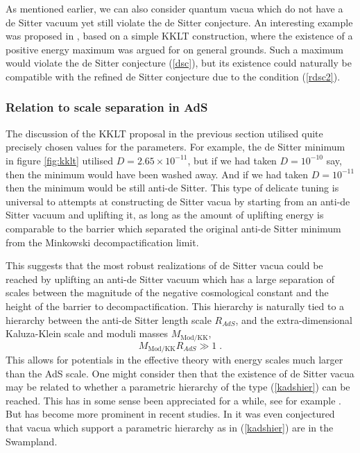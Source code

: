 \documentclass[11pt,a4paper]{article}
\numberwithin{equation}{section}
\numberwithin{table}{section}\setlength{\multlinegap}{25pt}
\newcommand{\be}{\begin{equation}}
\newcommand{\ee}{\end{equation}}
\begin{document}
{As mentioned earlier, we can also consider quantum vacua which do not have a de Sitter vacuum yet still violate the de Sitter conjecture. An interesting example was proposed in \cite{Conlon:2018eyr}, based on a simple KKLT construction, where the existence of a positive energy maximum was argued for on general grounds. Such a maximum would violate the de Sitter conjecture (\ref{dsc}), but its existence could naturally be compatible with the refined de Sitter conjecture due to the condition (\ref{rdsc2}). 

\subsubsection{Relation to scale separation in AdS}
\label{sec:scsepcon}

The discussion of the KKLT proposal in the previous section utilised quite precisely chosen values for the parameters. For example, the de Sitter minimum in figure \ref{fig:kklt} utilised $D=2.65 \times 10^{-11}$, but if we had taken $D= 10^{-10}$ say, then the minimum would have been washed away. And if we had taken $D=10^{-11}$ then the minimum would be still anti-de Sitter. This type of delicate tuning is universal to attempts at constructing de Sitter vacua by starting from an anti-de Sitter vacuum and uplifting it, as long as the amount of uplifting energy is comparable to the barrier which separated the original anti-de Sitter minimum from the Minkowski decompactification limit.  

This suggests that the most robust realizations of de Sitter vacua could be reached by uplifting an anti-de Sitter vacuum which has a large separation of scales between the magnitude of the negative cosmological constant and the height of the barrier to decompactification. This hierarchy is naturally tied to a hierarchy between the anti-de Sitter length scale $R_{AdS}$, and the extra-dimensional Kaluza-Klein scale and moduli masses $M_{\mathrm{Mod/KK}}$, 
\be
M_{\mathrm{Mod/KK}}R_{AdS} \gg 1 \;.
\label{kadshier}
\ee
This allows for potentials in the effective theory with energy scales much larger than the AdS scale. One might consider then that the existence of de Sitter vacua may be related to whether a parametric hierarchy of the type (\ref{kadshier}) can be reached. This has in some sense been appreciated for a while, see for example \cite{Kallosh:2004yh,Conlon:2008cj}. But has become more prominent in recent studies. In \cite{Gautason:2018gln} it was even conjectured that vacua which support a parametric hierarchy as in (\ref{kadshier}) are in the Swampland. 

}
\end{document}
